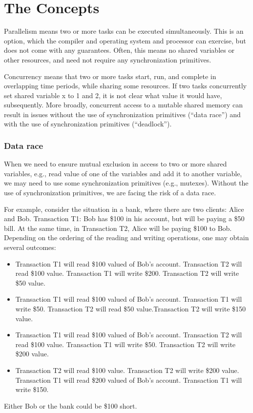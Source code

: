 \chapter{The Concepts}
\label{ch:concepts}

Parallelism means two or more tasks can be executed simultaneously. This is an option, which the compiler and operating system and processor can exercise, but does not come with any guarantees. 
Often, this means no shared variables or other resources, and need not require any synchronization primitives.

Concurrency means that two or more tasks start, run, and complete in overlapping time periods, while sharing some resources. 
If two tasks concurrently set shared variable x to 1 and 2, it is not clear what value it would have, subsequently.
More broadly, concurrent access to a mutable shared memory can result in issues without the use of synchronization 
primitives (``data race'') and with the use of synchronization primitives (``deadlock'').

\subsection{Data race}

When we need to ensure mutual exclusion in access to two or more shared variables, 
e.g., read value of one of the variables and add it to another variable, 
we may need to use some synchronization primitives (e.g., mutexes).
Without the use of synchronization primitives, we are facing the risk of a data race. 

For example, consider the situation in a bank, where there are two clients:
Alice and Bob. 
Transaction T1: Bob has \$100 in his account, but will be paying a \$50 bill. 
At the same time, in Transaction T2, Alice will be paying \$100 to Bob.
Depending on the ordering of the reading and writing operations, one may obtain several outcomes:
\begin{itemize}
\item Transaction T1 will read \$100 valued of Bob's account. Transaction T2 will read \$100 value.
 Transaction T1 will write \$200. Transaction T2 will write \$50 value.
\item Transaction T1 will read \$100 valued of Bob's account. 
 Transaction T1 will write \$50. Transaction T2 will read \$50 value.Transaction T2 will write \$150 value.
\item Transaction T1 will read \$100 valued of Bob's account. Transaction T2 will read \$100 value.
 Transaction T1 will write \$50. Transaction T2 will write \$200 value.
\item Transaction T2 will read \$100 value. Transaction T2 will write \$200 value.
  Transaction T1 will read \$200 valued of Bob's account.  Transaction T1 will write \$150.  
\end{itemize}
Either Bob or the bank could be \$100 short. 

